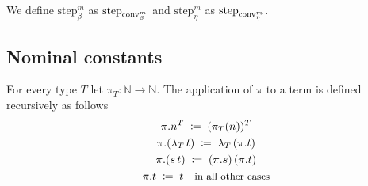 \documentclass[a4paper]{article}
\newtheorem{theorem}{Theorem}
\theoremstyle{definition}
\newcommand*{\inddef}[2]{#1 \; \coloneq \; #2}
\newcommand*{\tpquant}[2]{#1_{#2}}
\newcommand*{\tmapp}[2]{#1 \, #2}
\newcommand*{\tmabs}[2]{\tpquant{\lambda}{#1} \, #2}
\newcommand*{\tmnom}[2]{#2^{#1}}
\newcommand*{\hastype}[3]{#1 \vdash #2 : #3}
\newcommand*{\infcondr}[1]{\quad \text{\small #1}}
\newcommand*{\decrbound}[1]{#1^-}
\newcommand*{\subst}[3]{#1 \, [#3]_{#2}}
\newcommand*{\nommap}[2]{#1. #2}
\newcommand*{\listsep}{; \,}
\newcommand*{\length}[1]{|#1|}
\newcommand*{\step}[3]{\mathrm{step}_{#1}^{#2}#3}
\newcommand*{\betaconv}[2]{\mathrm{conv}_{\beta}^{#1}#2}
\newcommand*{\etaconv}[2]{\mathrm{conv}_{\eta}^{#1}#2}
\newcommand*{\betastep}[2]{\mathrm{step}_{\beta}^{#1}#2}
\newcommand*{\etastep}[2]{\mathrm{step}_{\eta}^{#1}#2}
\begin{document}
We define $\betastep{m}{}$ as $\step{\betaconv{m}{}}{}$ and $\etastep{m}{}$ as $\step{\etaconv{m}{}}{}$.




%


\subsection{Nominal constants}

For every type $T$ let $\pi_T \colon \mathbb{N} \to \mathbb{N}$.
The application of $\pi$ to a term is defined recursively as follows
\begin{gather*}
    \inddef{\nommap{\pi}{\tmnom{T}{n}}}{\tmnom{T}{(\pi_T (n))}} \\
    \inddef{\nommap{\pi}{(\tmabs{T}{t})}}{\tmabs{T}{(\nommap{\pi}{t})}} \\
    \inddef{\nommap{\pi}{(\tmapp{s}{t})}}{\tmapp{(\nommap{\pi}{s})}{(\nommap{\pi}{t})}} \\
    \inddef{\nommap{\pi}{t}}{t} \infcondr{in all other cases}
\end{gather*}
\end{document}
